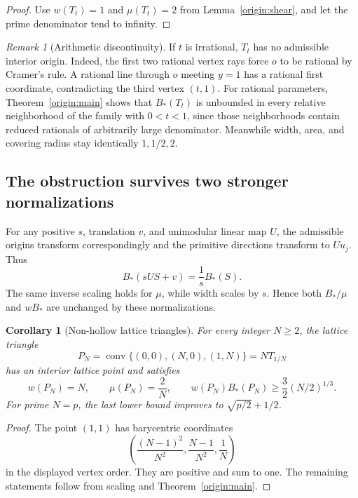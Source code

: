 \documentclass[11pt,a4paper]{article}
\newtheorem{corollary}[theorem]{Corollary}
\theoremstyle{remark}\newtheorem{remark}[theorem]{Remark}
\DeclareMathOperator{\conv}{conv}
\newcommand{\Bopt}{B_*}
\begin{document}
\begin{proof}
Use $w(T_t)=1$ and $\mu(T_t)=2$ from
Lemma~\ref{origin:shear}, and let the prime denominator tend
to infinity.
\end{proof}

\begin{remark}[Arithmetic discontinuity]\label{origin:irrational}
If $t$ is irrational, $T_t$ has no admissible interior origin.
Indeed, the first two rational vertex rays force $o$ to be
rational by Cramer's rule. A rational line through $o$ meeting
$y=1$ has a rational first coordinate, contradicting the third
vertex $(t,1)$. For rational parameters, Theorem~\ref{origin:main}
shows that $\Bopt(T_t)$ is unbounded in every relative neighborhood
of the family with $0<t<1$, since those neighborhoods contain
reduced rationals of arbitrarily large denominator. Meanwhile
width, area, and covering radius stay identically $1,1/2,2$.
\end{remark}

\subsection{The obstruction survives two stronger normalizations}

For any positive $s$, translation $v$, and unimodular linear map
$U$, the admissible origins transform correspondingly and the
primitive directions transform to $Uu_j$. Thus
\begin{equation}\label{origin:covariance}
 \Bopt(sUS+v)=\frac1s\Bopt(S).
\end{equation}
The same inverse scaling holds for $\mu$, while width scales by
$s$. Hence both $\Bopt/\mu$ and $w\Bopt$ are unchanged by
these normalizations.

\begin{corollary}[Non-hollow lattice triangles]\label{origin:lattice}
For every integer $N\ge2$, the lattice triangle
\[
 P_N=\conv\{(0,0),(N,0),(1,N)\}=NT_{1/N}
\]
has an interior lattice point and satisfies
\[
 w(P_N)=N,\qquad \mu(P_N)=\frac2N,
 \qquad
 w(P_N)\Bopt(P_N)\ge\frac32(N/2)^{1/3}.
\]
For prime $N=p$, the last lower bound improves to
$\sqrt{p/2}+1/2$.
\end{corollary}

\begin{proof}
The point $(1,1)$ has barycentric coordinates
\[
 \left(\frac{(N-1)^2}{N^2},\frac{N-1}{N^2},\frac1N\right)
\]
in the displayed vertex order. They are positive and sum to one.
The remaining statements follow from scaling and
Theorem~\ref{origin:main}.
\end{proof}
\end{document}
